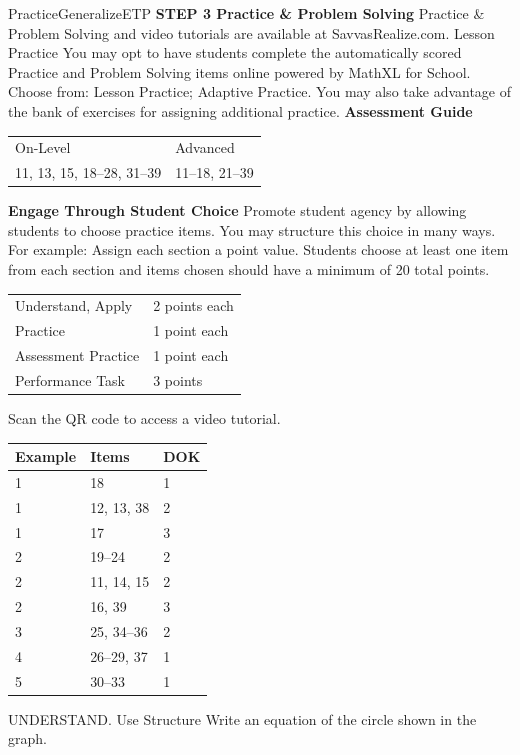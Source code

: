 \documentclass{article}
\newenvironment{item-analysis}{}{}      %
\newenvironment{practice}[2]{}{}        %
\newenvironment{te-addendum}[2]{}{}     %
\newcommand{\answer}[1]{}               %
\newcommand{\placeholder}[2]{}          %
\begin{document}
\begin{te-addendum}{Practice}{GeneralizeETP}
\textbf{STEP 3 Practice & Problem Solving}
Practice & Problem Solving and video tutorials are available at SavvasRealize.com.
Lesson Practice You may opt to have students complete the automatically scored Practice and Problem Solving items online powered by MathXL for School.
Choose from: Lesson Practice; Adaptive Practice.
You may also take advantage of the bank of exercises for assigning additional practice.
\textbf{Assessment Guide}
\begin{tabular}{ll}
On-Level & Advanced \\
11, 13, 15, 18--28, 31--39 & 11--18, 21--39 \\
\end{tabular}
\textbf{Engage Through Student Choice}
Promote student agency by allowing students to choose practice items. You may structure this choice in many ways.
For example:
Assign each section a point value. Students choose at least one item from each section and items chosen should have a minimum of 20 total points.
\begin{tabular}{ll}
Understand, Apply & 2 points each \\
Practice & 1 point each \\
Assessment Practice & 1 point each \\
Performance Task & 3 points \\
\end{tabular}
Scan the QR code to access a video tutorial.
\end{te-addendum}
\begin{item-analysis}
\begin{tabular}{lll}
\toprule
Example & Items & DOK \\
\midrule
1 & 18 & 1 \\
1 & 12, 13, 38 & 2 \\
1 & 17 & 3 \\
2 & 19--24 & 2 \\
2 & 11, 14, 15 & 2 \\
2 & 16, 39 & 3 \\
3 & 25, 34--36 & 2 \\
4 & 26--29, 37 & 1 \\
5 & 30--33 & 1 \\
\bottomrule
\end{tabular}
\end{item-analysis}
\begin{practice}{11}{2}
UNDERSTAND. Use Structure Write an equation of the circle shown in the graph.
\placeholder{graph}{Unit grid, black double-arrow x and y axes, O at origin; x labels -2,2,4,6, y labels 2,-2,-4,-6,-8, window x [-4,8], y [-9,3]. Red circle with filled center (2,-3), radius 5, extrema (-3,-3), (7,-3), (2,2), (2,-8).}
\answer{((x-2)^2+(y+3)^2=25)}
\end{practice}
\end{document}
